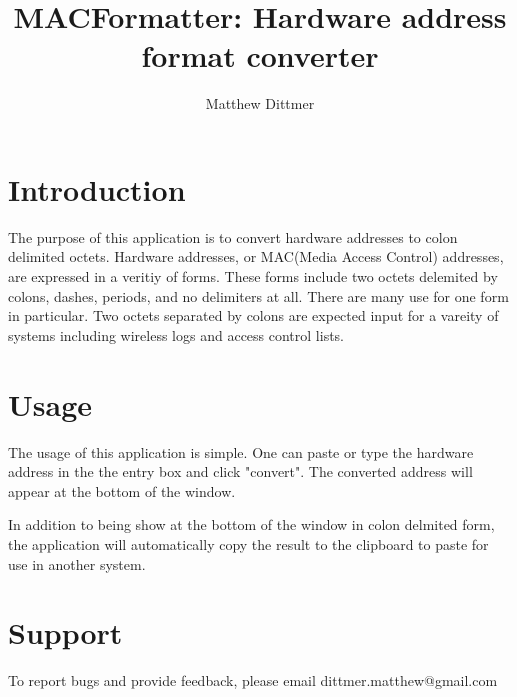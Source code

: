 \documentclass[10pt,a4paper,draft]{report}
\author{Matthew Dittmer}
\title{MACFormatter: Hardware address format converter}
\begin{document}
\maketitle
\chapter*{Introduction}

The purpose of this application is to convert hardware addresses to colon delimited octets.  Hardware addresses, or MAC(Media Access Control) addresses, are expressed in a veritiy of forms.  These forms include two octets delemited by colons, dashes, periods, and no delimiters at all.  There are many use for one form in particular.  Two octets separated by colons are expected input for a vareity of systems including wireless logs and access control lists.

\chapter*{Usage}

The usage of this application is simple.  One can paste or type the hardware address in the the entry box and click "convert".  The converted address will appear at the bottom of the window.

In addition to being show at the bottom of the window in colon delmited form, the application will automatically copy the result to the clipboard to paste for use in another system.

\chapter*{Support}

To report bugs and provide feedback, please email dittmer.matthew@gmail.com
\end{document}
